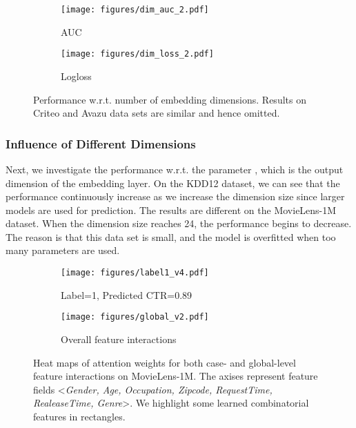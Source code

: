 \begin{figure}
\centering
\begin{subfigure}[b]{0.49\linewidth}
    \texttt{[image: figures/dim\_auc\_2.pdf]}
    \caption{AUC}
  \end{subfigure}
  \begin{subfigure}[b]{0.49\linewidth}
    \texttt{[image: figures/dim\_loss\_2.pdf]}
    \caption{Logloss}
  \end{subfigure}
  \caption{Performance w.r.t. number of embedding dimensions. Results on Criteo and Avazu data sets are similar and hence omitted.}
  \vspace{-10pt}
  \label{fig::dim}
\end{figure}



\subsubsection{Influence of Different Dimensions}
Next, we investigate the performance w.r.t. the parameter , which is the output dimension of the embedding layer. On the KDD12 dataset, we can see that the performance continuously increase as we increase the dimension size since larger models are used for prediction. The results are different on the MovieLens-1M dataset. When the dimension size reaches 24, the performance begins to decrease. The reason is that this data set is small, and the model is overfitted when too many parameters are used. 







\begin{figure}
\centering
\begin{subfigure}[b]{0.495\linewidth}
    \texttt{[image: figures/label1\_v4.pdf]}
    \caption{Label=1, Predicted CTR=0.89}
  \end{subfigure}
\begin{subfigure}[b]{0.495\linewidth}
      \texttt{[image: figures/global\_v2.pdf]}
      \caption{Overall feature interactions}
  	\end{subfigure}
  \caption{Heat maps of attention weights for both case- and global-level feature interactions on MovieLens-1M. The axises represent feature fields <\textit{Gender, Age, Occupation, Zipcode, RequestTime, RealeaseTime, Genre}>. We highlight some learned combinatorial features in rectangles.}
  \vspace{-11pt}
  \label{fig::case}
\end{figure}


